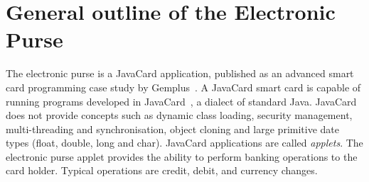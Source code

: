 \documentclass[a4paper]{llncs}
\begin{document}
\section{General outline of the Electronic Purse}
\label{SectGenPurse}

The electronic purse is a JavaCard application, published
as an advanced smart card programming case study by
Gemplus~\cite{PurseUrl}. A JavaCard smart card is capable of running
programs developed in {JavaCard}~\cite{JavaCardURL}, a dialect of
standard Java. {JavaCard} does not provide concepts such as dynamic
class loading, security management, multi-threading and
synchronisation, object cloning and large primitive date types (float,
double, long and char).  JavaCard applications are called
\emph{applets}.  The electronic purse applet provides  the ability to 
perform banking operations to the card holder. Typical operations are
credit, debit, and currency changes.
\end{document}
